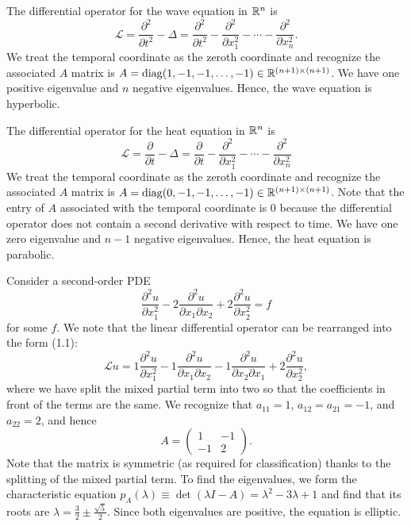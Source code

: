 \begin{example}
    The differential operator for the wave equation in $\mathbb{R}^n$ is
    \[\mathcal{L} = \frac{\partial^2}{\partial t^2} - \Delta = \frac{\partial^2}{\partial t^2} - \frac{\partial^2}{\partial x_1^2} - \cdots - \frac{\partial^2}{\partial x_n^2}.\]
    We treat the temporal coordinate as the zeroth coordinate and recognize the associated $A$ matrix is $A = \operatorname{diag}(1, -1, -1, \dots, -1) \in \mathbb{R}^{(n+1) \times (n+1)}$. We have one positive eigenvalue and $n$ negative eigenvalues. Hence, the wave equation is hyperbolic.
\end{example}

\begin{example}
    The differential operator for the heat equation in $\mathbb{R}^n$ is
    \[\mathcal{L} = \frac{\partial}{\partial t} - \Delta = \frac{\partial}{\partial t} - \frac{\partial^2}{\partial x_1^2} - \cdots - \frac{\partial^2}{\partial x_n^2}\]
    We treat the temporal coordinate as the zeroth coordinate and recognize the associated $A$ matrix is $A = \operatorname{diag}(0, -1, -1, \dots, -1) \in \mathbb{R}^{(n+1) \times (n+1)}$. Note that the entry of $A$ associated with the temporal coordinate is $0$ because the differential operator does not contain a second derivative with respect to time. We have one zero eigenvalue and $n - 1$ negative eigenvalues. Hence, the heat equation is parabolic.
\end{example}

\begin{example}
    Consider a second-order PDE
    \[\frac{\partial^2 u}{\partial x_1^2} - 2 \frac{\partial^2 u}{\partial x_1 \partial x_2} + 2 \frac{\partial^2 u}{\partial x_2^2} = f\]
    for some $f$. We note that the linear differential operator can be rearranged into the form (1.1):
    \[\mathcal{L} u = 1 \frac{\partial^2 u}{\partial x_1^2} - 1 \frac{\partial^2 u}{\partial x_1 \partial x_2} - 1 \frac{\partial^2 u}{\partial x_2 \partial x_1} + 2 \frac{\partial^2 u}{\partial x_2^2},\]
    where we have split the mixed partial term into two so that the coefficients in front of the terms are the same. We recognize that $a_{11} = 1$, $a_{12} = a_{21} = -1$, and $a_{22} = 2$, and hence
    \[A = \begin{pmatrix} 1 & -1 \\ -1 & 2 \end{pmatrix}.\]
    Note that the matrix is symmetric (as required for classification) thanks to the splitting of the mixed partial term. To find the eigenvalues, we form the characteristic equation $p_A(\lambda) \equiv \det(\lambda I - A) = \lambda^2 - 3\lambda + 1$ and find that its roots are $\lambda = \frac{3}{2} \pm \frac{\sqrt{5}}{2}$. Since both eigenvalues are positive, the equation is elliptic.
\end{example}


